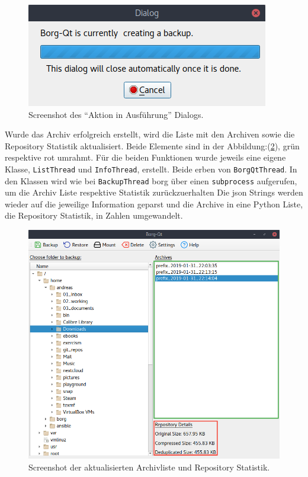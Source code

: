 \begin{figure}
\centering
\includegraphics[width=.4\paperwidth]{pictures/borgqt_progress_v2.png}
\caption{\label{fig:org52ca607}
Screenshot des "`Aktion in Ausführung"' Dialogs.}
\end{figure}

Wurde das Archiv erfolgreich erstellt, wird die Liste mit den Archiven sowie
die Repository Statistik aktualisiert. Beide Elemente sind in der
Abbildung:(\ref{fig:org24ed7cf}), grün respektive rot umrahmt. Für die
beiden Funktionen wurde jeweils eine eigene Klasse, \texttt{ListThread} und
\texttt{InfoThread}, erstellt. Beide erben von \texttt{BorgQtThread}. In den Klassen wird wie
bei \texttt{BackupThread} \gls{borg} über einen \texttt{subprocess} aufgerufen, um die Archiv Liste
respektive Statistik zurückzuerhalten Die \gls{json} Strings werden wieder auf
die jeweilige Information geparst und die Archive in eine Python Liste, die
Repository Statistik, in Zahlen umgewandelt.
\newpage

\begin{figure}[htbp]
\centering
\includegraphics[width=.9\linewidth]{pictures/borgqt_archive_list.png}
\caption{\label{fig:org24ed7cf}
Screenshot der aktualisierten Archivliste und Repository Statistik.}
\end{figure}

